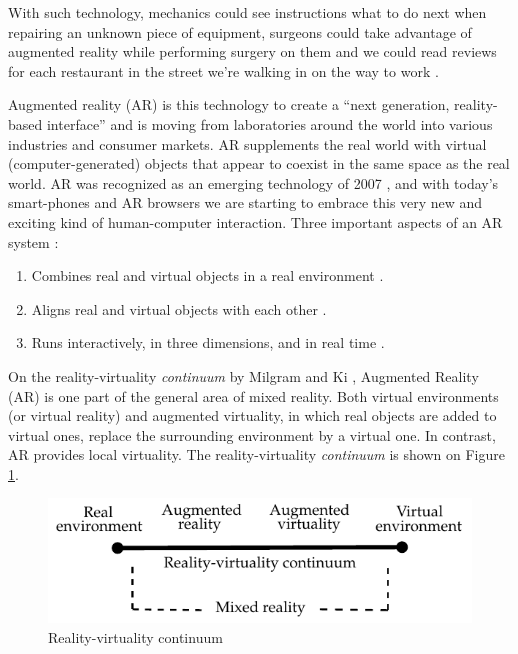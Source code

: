 With such technology, mechanics could see instructions what to do next when repairing an unknown piece of equipment, surgeons could take advantage of augmented reality while performing surgery on them and we could read reviews for each restaurant in the street we're walking in on the way to work \cite{Krevelen2010}.

Augmented reality (AR) is this technology to create a ``next generation, reality-based interface'' \cite{Krevelen2010} and is moving from laboratories around the world into various industries and consumer markets. AR supplements the real world with virtual (computer-generated) objects that appear to coexist in the same space as the real world. AR was recognized as an emerging technology of 2007 \cite{Krevelen2010}, and with today's smart-phones and AR browsers we are starting to embrace this very new and exciting kind of human-computer interaction. Three important aspects of an AR system \cite{Krevelen2010,Benford1998}:

\begin{enumerate}
  \item Combines real and virtual objects in a real environment \cite{Krevelen2010,Benford1998}.
  \item Aligns real and virtual objects with each other \cite{Krevelen2010,Benford1998}.
  \item Runs interactively, in three dimensions, and in real time \cite{Krevelen2010,Benford1998}.
\end{enumerate}

On the reality-virtuality \textit{continuum} by Milgram and Ki \cite{Mistry2009}, Augmented Reality (AR) is one part of the general area of mixed reality. Both virtual environments (or virtual reality) and augmented virtuality, in which real objects are added to virtual ones, replace the surrounding environment by a virtual one. In contrast, AR provides local virtuality. The reality-virtuality \textit{continuum} is shown on Figure \ref{figure:reality_continuum}.

\begin{figure}[!htb]
  \centering
  \includegraphics{chapters/basic_concepts/reality_continuum.pdf}
  \caption{Reality-virtuality continuum \cite{Benford1998}}
  \label{figure:reality_continuum}
\end{figure}

